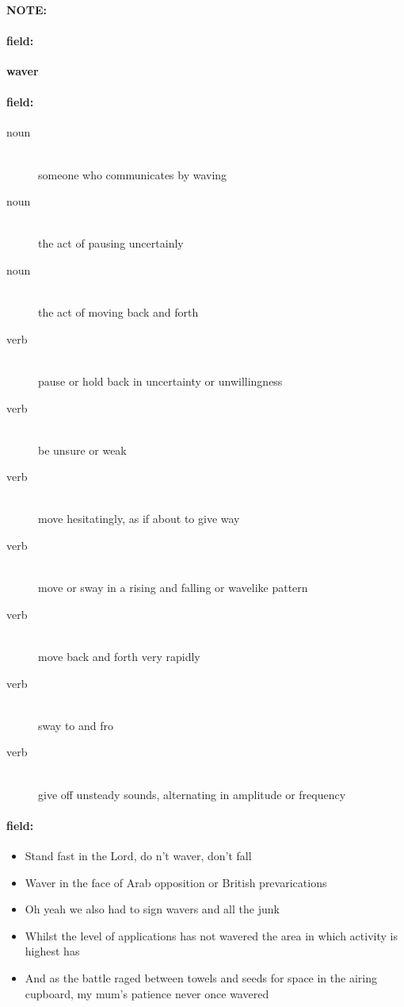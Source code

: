 \documentclass[12pt]{article}
\newenvironment{note}{\paragraph{NOTE:}}{}
\newenvironment{field}{\paragraph{field:}}{}
\begin{document}
\begin{note}
\begin{field}
\textbf{\large waver}
\end{field}


\begin{field}
\begin{description}
\item[noun] \hfill \\ 
someone who communicates by waving

\item[noun] \hfill \\ 
the act of pausing uncertainly

\item[noun] \hfill \\ 
the act of moving back and forth

\item[verb] \hfill \\ 
pause or hold back in uncertainty or unwillingness

\item[verb] \hfill \\ 
be unsure or weak

\item[verb] \hfill \\ 
move hesitatingly, as if about to give way

\item[verb] \hfill \\ 
move or sway in a rising and falling or wavelike pattern

\item[verb] \hfill \\ 
move back and forth very rapidly

\item[verb] \hfill \\ 
sway to and fro

\item[verb] \hfill \\ 
give off unsteady sounds, alternating in amplitude or frequency

\end{description}
\end{field}

\begin{field}
\begin{itemize}
\item Stand fast in the Lord, do n't waver, don't fall
\item Waver in the face of Arab opposition or British prevarications
\item Oh yeah we also had to sign wavers and all the junk
\item Whilst the level of applications has not wavered the area in which activity is highest has
\item And as the battle raged between towels and seeds for space in the airing cupboard, my mum's patience never once wavered
\end{itemize}
\end{field}
\end{note}
\end{document}
